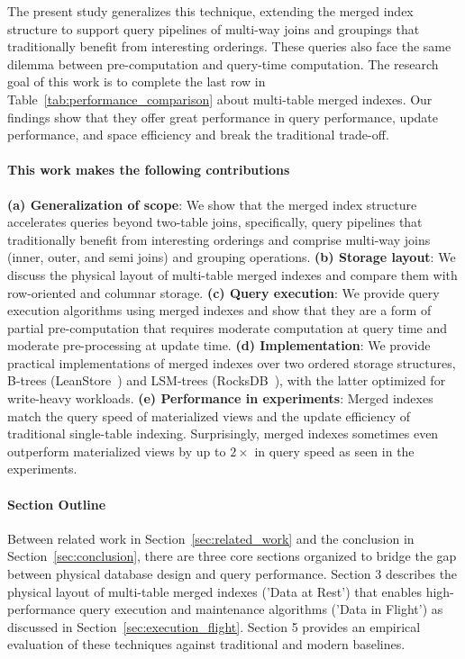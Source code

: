 \documentclass[sigconf, pdfa, nonacm]{acmart}
\begin{document}
The present study generalizes this technique, extending the merged index structure to support query pipelines of multi-way joins and groupings that traditionally benefit from interesting orderings. 
These queries also face the same dilemma between pre-computation and query-time computation.
The research goal of this work is to complete the last row in Table~\ref{tab:performance_comparison} about multi-table merged indexes.
Our findings show that they offer great performance in query performance, update performance, and space efficiency and break the traditional trade-off.

\paragraph{This work makes the following contributions}

\textbf{(a) Generalization of scope}: We show that the merged index structure accelerates queries beyond two-table joins, specifically, query pipelines that traditionally benefit from interesting orderings and comprise multi-way joins (inner, outer, and semi joins) and grouping operations.
\textbf{(b) Storage layout}: We discuss the physical layout of multi-table merged indexes and compare them with row-oriented and columnar storage.
\textbf{(c) Query execution}: We provide query execution algorithms using merged indexes and show that they are a form of partial pre-computation that requires moderate computation at query time and moderate pre-processing at update time.
\textbf{(d) Implementation}: We provide practical implementations of merged indexes over two ordered storage structures, B-trees (LeanStore~\cite{leanstore18}) and LSM-trees (RocksDB~\cite{rocksdb21}), with the latter optimized for write-heavy workloads.
\textbf{(e) Performance in experiments}: Merged indexes match the query speed of materialized views and the update efficiency of traditional single-table indexing. Surprisingly, merged indexes sometimes even outperform materialized views by up to \(2\times\) in query speed as seen in the experiments.

\paragraph{Section Outline}
Between related work in Section~\ref{sec:related_work} and the conclusion in Section~\ref{sec:conclusion}, there are three core sections organized to bridge the gap between physical database design and query performance. Section 3 describes the physical layout of multi-table merged indexes ('Data at Rest') that enables high-performance query execution and maintenance algorithms ('Data in Flight') as discussed in Section~\ref{sec:execution_flight}. Section 5 provides an empirical evaluation of these techniques against traditional and modern baselines.
\end{document}
